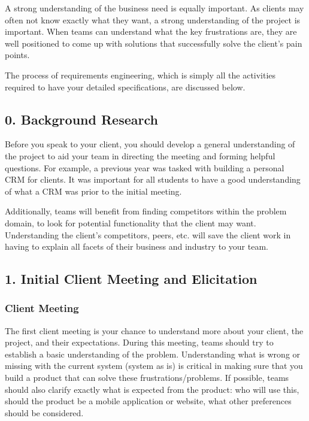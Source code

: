 \documentclass[letterpaper,10pt,english]{jupyterBook}
\begin{document}
\sphinxAtStartPar
A strong understanding of the business need is equally important. As
clients may often not know exactly what they want, a strong
understanding of the project is important. When teams can understand
what the key frustrations are, they are well positioned to come up with
solutions that successfully solve the client’s pain points.

\sphinxAtStartPar
The process of requirements engineering, which is simply all the
activities required to have your detailed specifications, are discussed
below.


\subsection{0. Background Research}
\label{\detokenize{chapter_8/requirements_elicitation:background-research}}
\sphinxAtStartPar
Before you speak to your client, you should develop a general
understanding of the project to aid your team in directing the meeting
and forming helpful questions. For example, a previous year was tasked
with building a personal CRM for clients. It was important for all
students to have a good understanding of what a CRM was prior to the
initial meeting.

\sphinxAtStartPar
Additionally, teams will benefit from finding competitors within the
problem domain, to look for potential functionality that the client may
want. Understanding the client’s competitors, peers, etc. will save the
client work in having to explain all facets of their business and
industry to your team.


\subsection{1. Initial Client Meeting and Elicitation}
\label{\detokenize{chapter_8/requirements_elicitation:initial-client-meeting-and-elicitation}}

\subsubsection{Client Meeting}
\label{\detokenize{chapter_8/requirements_elicitation:client-meeting}}
\sphinxAtStartPar
The first client meeting is your chance to understand more about your
client, the project, and their expectations. During this meeting, teams
should try to establish a basic understanding of the problem.
Understanding what is wrong or missing with the current system (system
as is) is critical in making sure that you build a product that can
solve these frustrations/problems. If possible, teams should also
clarify exactly what is expected from the product: who will use this,
should the product be a mobile application or website, what other
preferences should be considered.
\end{document}
